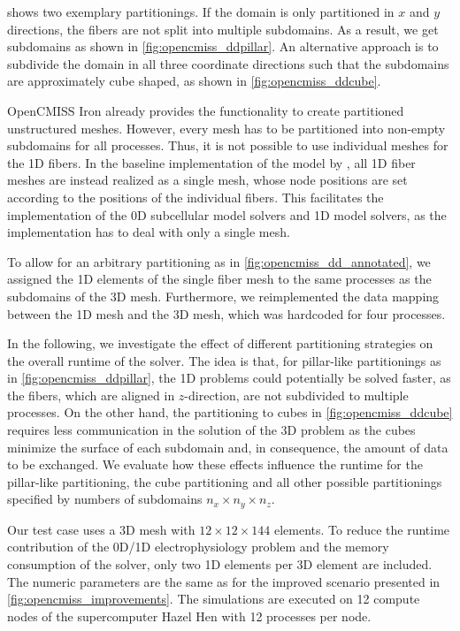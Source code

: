  shows two exemplary partitionings. If the domain is only partitioned in $x$ and $y$ directions, the fibers are not split into multiple subdomains. As a result, we get  subdomains as shown in \cref{fig:opencmiss_ddpillar}. An alternative approach is to subdivide the domain in all three coordinate directions such that the subdomains are approximately cube shaped, as shown in \cref{fig:opencmiss_ddcube}.

OpenCMISS Iron already provides the functionality to create partitioned unstructured meshes. However, every mesh has to be partitioned into non-empty subdomains for all processes. Thus, it is not possible to use individual meshes for the 1D fibers.
In the baseline implementation of the model by \cite{Heidlauf2013}, all 1D fiber meshes are instead realized as a single mesh, whose node positions are set according to the positions of the individual fibers. This facilitates the implementation of the 0D subcellular model solvers and 1D model solvers, as the implementation has to deal with only a single mesh. 

To allow for an arbitrary partitioning as in \cref{fig:opencmiss_dd_annotated}, we assigned the 1D elements of the single fiber mesh to the same processes as the subdomains of the 3D mesh. Furthermore, we reimplemented the data mapping between the 1D mesh and the 3D mesh, which was hardcoded for four processes.

In the following, we investigate the effect of different partitioning strategies on the overall runtime of the solver. The idea is that, for pillar-like partitionings as in \cref{fig:opencmiss_ddpillar}, the 1D problems could potentially be solved faster, as the fibers, which are aligned in $z$-direction, are not subdivided to multiple processes. On the other hand, the partitioning to cubes in \cref{fig:opencmiss_ddcube} requires less communication in the solution of the 3D problem as the cubes minimize the surface of each subdomain and, in consequence, the amount of data to be exchanged. We evaluate how these effects influence the runtime for the pillar-like partitioning, the cube partitioning and all other possible partitionings specified by numbers of subdomains $n_x \times n_y \times n_z$.

Our test case uses a 3D mesh with $12 \times 12 \times 144$ elements. To reduce the runtime contribution of the 0D/1D electrophysiology problem and the memory consumption of the solver, only two 1D elements per 3D element are included. The numeric parameters are the same as for the improved scenario presented in \cref{fig:opencmiss_improvements}. The simulations are executed on 12 compute nodes of the supercomputer Hazel Hen with 12 processes per node.

